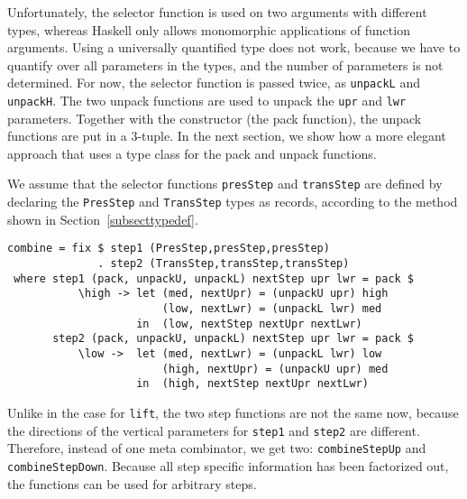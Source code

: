 Unfortunately, the selector function is used on two arguments with different types, whereas Haskell only allows monomorphic applications of function arguments. Using a universally quantified type does not work, because we have to quantify over all parameters in the types, and the number of parameters is not determined. For now, the selector function is passed twice, as \texttt{unpackL} and \texttt{unpackH}. The two unpack functions are used to unpack the \texttt{upr} and \texttt{lwr} parameters. Together with the constructor (the pack function), the unpack functions are put in a 3-tuple. In the next section, we show how a more elegant approach that uses a type class for the pack and unpack functions.

We assume that the selector functions \texttt{presStep} and \texttt{transStep} are defined by declaring the \texttt{PresStep} and \texttt{TransStep} types as records, according to the method shown in Section~\ref{subsecttypedef}.

\begin{small}
\begin{verbatim}
combine = fix $ step1 (PresStep,presStep,presStep) 
              . step2 (TransStep,transStep,transStep) 
 where step1 (pack, unpackU, unpackL) nextStep upr lwr = pack $
           \high -> let (med, nextUpr) = (unpackU upr) high
                        (low, nextLwr) = (unpackL lwr) med
                    in  (low, nextStep nextUpr nextLwr)
       step2 (pack, unpackU, unpackL) nextStep upr lwr = pack $
           \low ->  let (med, nextLwr) = (unpackL lwr) low
                        (high, nextUpr) = (unpackU upr) med
                    in  (high, nextStep nextUpr nextLwr)
\end{verbatim}
\end{small}

Unlike in the case for \texttt{lift}, the two step functions are not the same now, because the directions of the vertical parameters for \texttt{step1} and \texttt{step2} are different. Therefore, instead of one meta combinator, we get two: \texttt{combineStepUp} and \texttt{combineStepDown}. Because all step specific information has been factorized out, the functions can be used for arbitrary steps.

